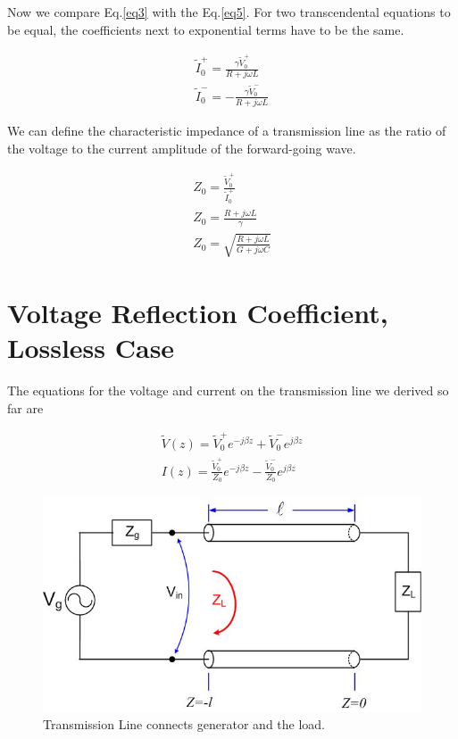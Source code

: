 \documentclass{ximera}
\begin{document}
Now we compare Eq.\ref{eq3} with the Eq.\ref{eq5}. For two transcendental equations to be equal, the coefficients next to exponential terms have to be the same.

\begin{eqnarray}
\tilde{I}_0^+=\frac{\gamma \tilde{V}_0^+}{R+ j \omega L} \nonumber  \\
\tilde{I}_0^-= - \frac{\gamma \tilde{V}_0^-}{R+ j \omega L} \nonumber
\end{eqnarray}

We can define the characteristic impedance of a transmission line as
the ratio of the voltage to the current amplitude of the forward-going
wave.


\begin{eqnarray}
Z_0=\frac{\tilde{V}_0^+}{ \tilde{I}_0^+} \nonumber   \\ \nonumber
Z_0=\frac{R+j\omega L}{\gamma} \nonumber   \\ \nonumber
Z_0=\sqrt{\frac{R+j\omega L}{G+ j\omega C}}
\end{eqnarray}






\section{Voltage Reflection Coefficient, Lossless Case}

The equations for the voltage and current on the transmission line we
derived so far are

\begin{eqnarray}
\tilde{V}(z)=\tilde{V}_0^+ e^{-j \beta z} +\tilde{V}_0^- e^{j \beta z} \label{vtl} \\ \label{ctl}
I(z)=\frac{\tilde{V}_0^+}{Z_0} e^{- j \beta z} - \frac{\tilde{V}_0^-}{Z_0} e^{j \beta z}
\end{eqnarray}



\begin{figure}[htbp]
\begin{center}
\includegraphics[scale=0.3]{../jpg/trline.jpg}
\end{center}
\caption{Transmission Line connects generator and the load.}
\label{wind1}
\end{figure}
\end{document}

